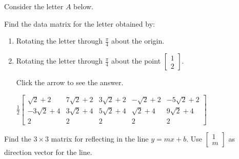 \documentclass{ximera}
\begin{document}
\begin{problem}\label{prob:app0040_1}
Consider the letter $A$ below. 
\begin{center}
\end{center}  

Find the data matrix for the letter obtained by:


\begin{enumerate} 
\item Rotating the letter through $\frac{\pi}{4}$ about the origin.

\item Rotating the letter through $\frac{\pi}{4}$
 about the point $\left[
 \begin{array}{c}
 1\\
 2
 \end{array}
 \right]$.

Click the arrow to see the answer.
\begin{expandable}
${\frac{1}{2}\left[
\begin{array}{ccccc}
\sqrt{2} + 2 & 7\sqrt{2} + 2 & 3\sqrt{2} + 2 & -\sqrt{2} + 2 & -5\sqrt{2} + 2\\
-3\sqrt{2} + 4 & 3\sqrt{2} + 4 & 5\sqrt{2} + 4 & \sqrt{2} + 4 & 9\sqrt{2} + 4 \\
2 & 2 & 2 & 2 & 2
\end{array}
\right]}$
\end{expandable}
\end{enumerate}
\end{problem}


\begin{problem}\label{prob:app0040_3}
Find the $3 \times 3$ matrix for reflecting in the line $y = mx + b$. Use $\left[
\begin{array}{c}
1\\
m
\end{array}
\right]$ as direction vector for the line.
\end{problem}
\end{document}
